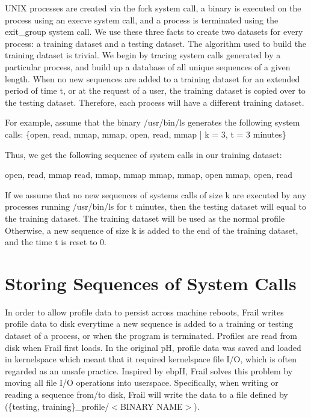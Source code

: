 \documentclass{report}
\begin{document}
\begin{spacing}{1.5}
{\large
UNIX processes are created via the fork system call, a binary is executed on the process using an execve system call, and a process is terminated using the exit\_group system call. We use these three facts to create two datasets for every process: a training dataset and a testing dataset. The algorithm used to build the training dataset is trivial. We begin by tracing system calls generated by a particular process, and build up a database of all unique sequences of a given length. When no new sequences are added to a training dataset for an extended period of time t, or at the request of a user, the training dataset is copied over to the testing dataset. Therefore, each process will have a different training dataset.
\newline
}

{\large
\noindent For example, assume that the binary /usr/bin/ls generates the following system calls:
\newline \newline
\indent \indent \indent \{open, read, mmap, mmap, open, read, mmap \big|  k = 3, t = 3 minutes\}
\leavevmode\newline
}

{\large
\noindent Thus, we get the following sequence of system calls in our training dataset: \newline

\indent \indent \indent open, read, mmap \newline
\indent \indent \indent read, mmap, mmap \newline
\indent \indent \indent mmap, mmap, open \newline
\indent \indent \indent mmap, open, read \newline

\noindent If we assume that no new sequences of systems calls of size k are executed by any processes running /usr/bin/ls for t minutes, then the testing dataset will equal to the training dataset. The training dataset will be used as the normal profile Otherwise, a new sequence of size k is added to the end of the training dataset, and the time t is reset to 0.
}

\section{Storing Sequences of System Calls}


{\large
In order to allow profile data to persist across machine reboots, Frail writes profile data to disk everytime a new sequence is added to a training or testing dataset of a process, or when the program is terminated. Profiles are read from disk when Frail first loads. In the original pH, profile data was saved and loaded in kernelspace \cite{somayaji2002operating} which meant that it required kernelspace file I/O, which is often regarded as an unsafe practice. Inspired by ebpH, Frail solves this problem by moving all file I/O operations into userspace. Specifically, when writing or reading a sequence from/to disk, Frail will write the data to a file defined by (\{testing, training\}\_profile/$<$BINARY NAME$>$).
\newline
}




\end{spacing}
\end{document}

